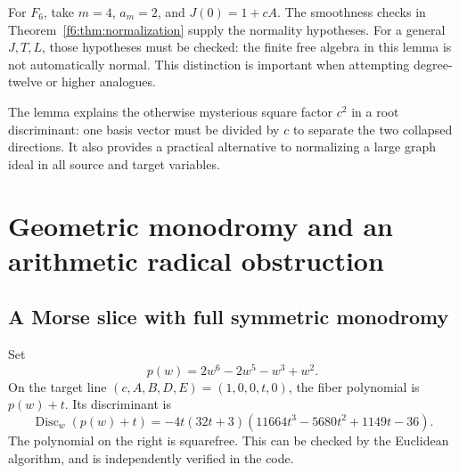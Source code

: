 \documentclass[11pt,a4paper]{article}
\theoremstyle{definition}
\newcommand{\Disc}{\operatorname{Disc}}
\begin{document}
For $F_6$, take $m=4$, $a_m=2$, and $J(0)=1+cA$.
The smoothness checks in Theorem~\ref{f6:thm:normalization} supply the
normality hypotheses. For a general $J,T,L$, those hypotheses must be
checked: the finite free algebra in this lemma is not automatically
normal. This distinction is important when attempting degree-twelve or
higher analogues.

The lemma explains the otherwise mysterious square factor $c^2$ in a
root discriminant: one basis vector must be divided by $c$ to separate
the two collapsed directions. It also provides a practical alternative
to normalizing a large graph ideal in all source and target variables.

\section{Geometric monodromy and an arithmetic radical obstruction}
\label{f6:sec:galois}

\subsection{A Morse slice with full symmetric monodromy}
Set
\[
 p(w)=2w^6-2w^5-w^3+w^2.
\]
On the target line $(c,A,B,D,E)=(1,0,0,t,0)$, the fiber polynomial is
$p(w)+t$. Its discriminant is
\begin{equation}\label{f6:eq:morsedisc}
 \Disc_w(p(w)+t)
 =-4t(32t+3)(11664t^3-5680t^2+1149t-36).
\end{equation}
The polynomial on the right is squarefree. This can be checked by the
Euclidean algorithm, and is independently verified in the code.
\end{document}
